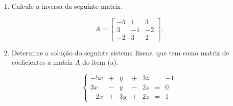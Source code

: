 \begin{problem}
\begin{enumerate}
\item[(a)] Calcule a inversa da seguinte matriz.

$$A=\left[ \begin{array}{rrrr}
-5  &   1  &    3  \\
 3  &  -1  &   -2  \\
-2  &   3  &    2 
 \end{array} \right] .$$

\medskip
\item[(b)] Determine a solução do seguinte sistema linear, que tem como matriz de \linebreak 
coeficientes a matriz $A$ do item (a).

$$ \left\{\begin{array}{rrrrrrr}
 -5x & + &   y & + &  3z & = &  -1\\
  3x & - &   y & - &  2z & = &   0\\
 -2x & + &  3y & + &  2z & = &   1
\end{array} \right.$$

\end{enumerate}
\end{problem}
